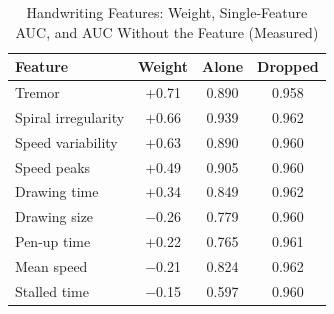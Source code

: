 \begin{table}[t]
\centering
\caption{Handwriting Features: Weight, Single-Feature AUC, and AUC Without the Feature (Measured)}
\label{tab:ablate}
\footnotesize
\begin{tabular}{@{}lccc@{}}
\toprule
Feature & Weight & Alone & Dropped \\
\midrule
Tremor & +0.71 & 0.890 & 0.958 \\
Spiral irregularity & +0.66 & 0.939 & 0.962 \\
Speed variability & +0.63 & 0.890 & 0.960 \\
Speed peaks & +0.49 & 0.905 & 0.960 \\
Drawing time & +0.34 & 0.849 & 0.962 \\
Drawing size & $-$0.26 & 0.779 & 0.960 \\
Pen-up time & +0.22 & 0.765 & 0.961 \\
Mean speed & $-$0.21 & 0.824 & 0.962 \\
Stalled time & $-$0.15 & 0.597 & 0.960 \\
\bottomrule
\end{tabular}
\end{table}
